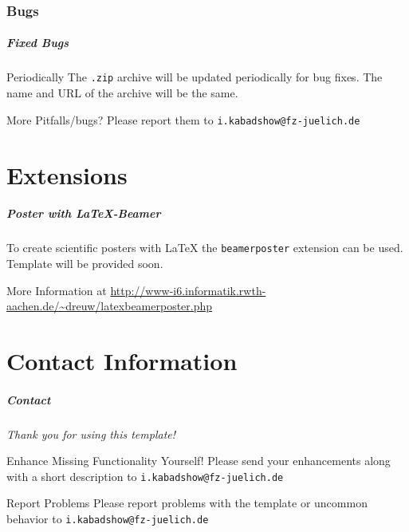 \documentclass[
t, %
10pt, %
aspectratio=1610, %
ngerman,
english,
]{beamer}
\begin{document}
\section{Bugs}
\begin{frame}[fragile,label=bugs]
        \frametitle{Fixed Bugs}
        \begin{block}{Periodically}
        The \verb+.zip+ archive will be updated periodically for bug fixes. The name and URL of the archive will be the same.
    \end{block}
        \begin{block}{More Pitfalls/bugs?}
                Please report them to {\tt i.kabadshow@fz-juelich.de}
    \end{block}
\end{frame}


\part{Extensions}
\makepart
\begin{frame}[fragile]
        \frametitle{Poster with \LaTeX -Beamer}
        To create scientific posters with {\LaTeX} the \verb!beamerposter! extension
        can be used. Template will be provided soon.
        \begin{block}{More Information at}
    \small
    \url{http://www-i6.informatik.rwth-aachen.de/~dreuw/latexbeamerposter.php}
    \end{block}
\end{frame}

\part{Contact Information}
\begin{frame}[c,label=contact]
        \frametitle{Contact}
        \begin{center}
                \Large \emph{Thank you for using this template!}
        \end{center}
        \begin{block}{Enhance Missing Functionality Yourself!}
                Please send your enhancements along with a short description to {\tt i.kabadshow@fz-juelich.de}
        \end{block}
        \begin{block}{Report Problems}
                Please report problems with the template or uncommon behavior to {\tt i.kabadshow@fz-juelich.de}
        \end{block}
\end{frame}
\end{document}
